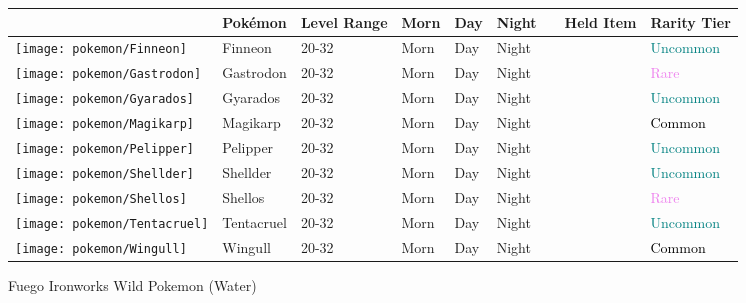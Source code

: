 \begin{longtable}{||l l l l l l l l l||}%
\hline%
&Pokémon&Level Range&Morn&Day&Night&&Held Item&Rarity Tier\\%
\hline%
\endhead%
\hline%
\texttt{[image: pokemon/Finneon]}&Finneon&20{-}32&Morn&Day&Night&&&\textcolor{teal}{%
Uncommon%
}\\%
\hline%
\texttt{[image: pokemon/Gastrodon]}&Gastrodon&20{-}32&Morn&Day&Night&&&\textcolor{violet}{%
Rare%
}\\%
\hline%
\texttt{[image: pokemon/Gyarados]}&Gyarados&20{-}32&Morn&Day&Night&&&\textcolor{teal}{%
Uncommon%
}\\%
\hline%
\texttt{[image: pokemon/Magikarp]}&Magikarp&20{-}32&Morn&Day&Night&&&\textcolor{black}{%
Common%
}\\%
\hline%
\texttt{[image: pokemon/Pelipper]}&Pelipper&20{-}32&Morn&Day&Night&&&\textcolor{teal}{%
Uncommon%
}\\%
\hline%
\texttt{[image: pokemon/Shellder]}&Shellder&20{-}32&Morn&Day&Night&&&\textcolor{teal}{%
Uncommon%
}\\%
\hline%
\texttt{[image: pokemon/Shellos]}&Shellos&20{-}32&Morn&Day&Night&&&\textcolor{violet}{%
Rare%
}\\%
\hline%
\texttt{[image: pokemon/Tentacruel]}&Tentacruel&20{-}32&Morn&Day&Night&&&\textcolor{teal}{%
Uncommon%
}\\%
\hline%
\texttt{[image: pokemon/Wingull]}&Wingull&20{-}32&Morn&Day&Night&&&\textcolor{black}{%
Common%
}\\%
\hline%
\end{longtable}%
\caption{Fuego Ironworks Wild Pokemon (Water)}